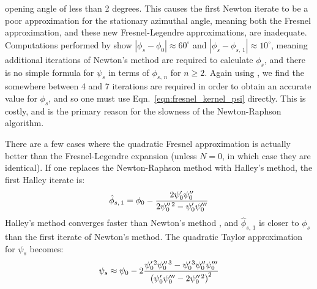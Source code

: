 \documentclass{article}
\theoremstyle{plain}
\begin{document}
        opening angle of less than 2 degrees. This causes the first Newton
        iterate to be a poor approximation for the stationary azimuthal angle,
        meaning both the Fresnel approximation, and these new Fresnel-Legendre
        approximations, are inadequate. Computations performed by
        \cite{RssRingoccsGithub} show $|\phi_{s}-\phi_{0}|\approx{60}^{\circ}$
        and $|\phi_{s}-\phi_{s,\,1}|\approx{10}^{\circ}$, meaning additional
        iterations of Newton's method are required
        to calculate $\phi_{s}$, and there is no
        simple formula for $\psi_{s}$ in terms of $\phi_{s,\,n}$ for $n\geq{2}$.
        Again using \cite{RssRingoccsGithub}, we find the somewhere between 4
        and 7 iterations are required in order to obtain an accurate value for
        $\phi_{s}$, and so one must use
        Eqn.~\ref{eqn:fresnel_kernel_psi} directly. This is costly, and is the
        primary reason for the slowness of the Newton-Raphson algorithm.
        \par\hfill\par
        There are a few cases where the quadratic Fresnel approximation is
        actually better than the Fresnel-Legendre expansion (unless $N=0$,
        in which case they are identical). If one replaces the Newton-Raphson
        method with Halley's method, the first Halley iterate is:
        \begin{equation}
            \hat{\phi}_{s,\,1}
            =\phi_{0}-
            \frac{%
                2\psi^{\prime}_{0}\psi^{\prime\prime}_{0}%
            }{%
                2\psi^{\prime\prime\,2}_{0}-%
                \psi^{\prime}_{0}\psi^{\prime\prime\prime}_{0}
            }
        \end{equation}
        Halley's method converges faster than Newton's method
        \cite{AlefeldHalleysMethod}, and $\hat{\phi}_{s,\,1}$ is closer to
        $\phi_{s}$ than the first iterate of Newton's method. The quadratic
        Taylor approximation for $\psi_{s}$ becomes:
        \begin{equation}
            \psi_{s}
            \approx\psi_{0}-2
            \frac{%
                \psi^{\prime\,2}_{0}
                \psi^{\prime\prime\,3}_{0}-
                \psi^{\prime\,3}_{0}
                \psi^{\prime\prime}_{0}
                \psi^{\prime\prime\prime}_{0}
            }{%
                \left(
                    \psi^{\prime}_{0}\psi^{\prime\prime\prime}_{0}
                    -2\psi^{\prime\prime\,2}_{0}
                \right)^{2}
            }
        \end{equation}
\end{document}
